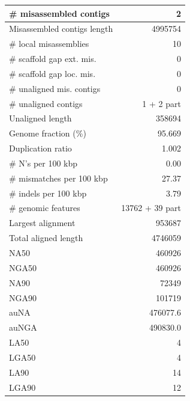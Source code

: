\documentclass[12pt,a4paper]{article}
\begin{document}
\begin{table}[ht]
\begin{center}
\begin{tabular}{|l*{1}{|r}|}
\# misassembled contigs & 2 \\ \hline
Misassembled contigs length & 4995754 \\ \hline
\# local misassemblies & 10 \\ \hline
\# scaffold gap ext. mis. & 0 \\ \hline
\# scaffold gap loc. mis. & 0 \\ \hline
\# unaligned mis. contigs & 0 \\ \hline
\# unaligned contigs & 1 + 2 part \\ \hline
Unaligned length & 358694 \\ \hline
Genome fraction (\%) & 95.669 \\ \hline
Duplication ratio & 1.002 \\ \hline
\# N's per 100 kbp & 0.00 \\ \hline
\# mismatches per 100 kbp & 27.37 \\ \hline
\# indels per 100 kbp & 3.79 \\ \hline
\# genomic features & 13762 + 39 part \\ \hline
Largest alignment & 953687 \\ \hline
Total aligned length & 4746059 \\ \hline
NA50 & 460926 \\ \hline
NGA50 & 460926 \\ \hline
NA90 & 72349 \\ \hline
NGA90 & 101719 \\ \hline
auNA & 476077.6 \\ \hline
auNGA & 490830.0 \\ \hline
LA50 & 4 \\ \hline
LGA50 & 4 \\ \hline
LA90 & 14 \\ \hline
LGA90 & 12 \\ \hline
\end{tabular}
\end{center}
\end{table}
\end{document}
